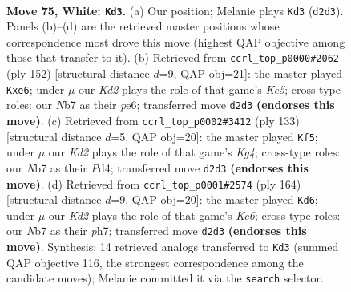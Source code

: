 \documentclass[11pt]{article}
\begin{document}
\clearpage

\begin{figure}[p]\centering
\begin{subfigure}{0.46\textwidth}\centering
\resizebox{\linewidth}{!}{%
\newchessgame
\chessboard[
  setfen={6k1/1NP5/2r5/8/8/6B1/3K4/8 w - - 63 75},
  showmover=false,
  pgfstyle=straightmove, color=movearrow, markmove={d2-d3}
]}
\caption{}
\end{subfigure}\hfill
\begin{subfigure}{0.46\textwidth}\centering
\resizebox{\linewidth}{!}{%
\newchessgame
\chessboard[
  setfen={r7/P7/4p3/4K3/2k5/8/5B2/8 w - - 1 77},
  showmover=false,
  pgfstyle=straightmove, color=movearrow, markmove={e5-e6}
]}
\caption{}
\end{subfigure}
\\[4pt]
\begin{subfigure}{0.46\textwidth}\centering
\resizebox{\linewidth}{!}{%
\newchessgame
\chessboard[
  setfen={1b6/8/8/6k1/3p4/5K2/7p/7R b - - 7 67},
  showmover=false,
  pgfstyle=straightmove, color=movearrow, markmove={g5-f5}
]}
\caption{}
\end{subfigure}\hfill
\begin{subfigure}{0.46\textwidth}\centering
\resizebox{\linewidth}{!}{%
\newchessgame
\chessboard[
  setfen={8/6Bp/2K4P/7r/4k3/8/8/8 w - - 25 83},
  showmover=false,
  pgfstyle=straightmove, color=movearrow, markmove={c6-d6}
]}
\caption{}
\end{subfigure}
\caption{\textbf{Move 75, White: \texttt{Kd3}.} (a) Our position; Melanie plays \texttt{Kd3} (\texttt{d2d3}). Panels (b)--(d) are the retrieved master positions whose correspondence most drove this move (highest QAP objective among those that transfer to it). (b) Retrieved from \texttt{ccrl\_top\_p0000\#2062} (ply 152) [structural distance $d$=9, QAP obj=21]: the master played \texttt{Kxe6}; under $\mu$ our \emph{Kd2} plays the role of that game's \emph{Ke5}; cross-type roles: our \emph{N}b7 as their \emph{p}e6; transferred move \texttt{d2d3} \textbf{(endorses this move)}. (c) Retrieved from \texttt{ccrl\_top\_p0002\#3412} (ply 133) [structural distance $d$=5, QAP obj=20]: the master played \texttt{Kf5}; under $\mu$ our \emph{Kd2} plays the role of that game's \emph{Kg4}; cross-type roles: our \emph{N}b7 as their \emph{P}d4; transferred move \texttt{d2d3} \textbf{(endorses this move)}. (d) Retrieved from \texttt{ccrl\_top\_p0001\#2574} (ply 164) [structural distance $d$=9, QAP obj=20]: the master played \texttt{Kd6}; under $\mu$ our \emph{Kd2} plays the role of that game's \emph{Kc6}; cross-type roles: our \emph{N}b7 as their \emph{p}h7; transferred move \texttt{d2d3} \textbf{(endorses this move)}. Synthesis: 14 retrieved analogs transferred to \texttt{Kd3} (summed QAP objective 116, the strongest correspondence among the candidate moves); Melanie committed it via the \texttt{search} selector.}
\label{fig:thought-m148}
\end{figure}
\end{document}
